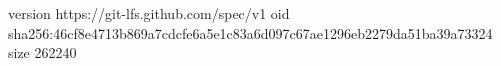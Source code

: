 version https://git-lfs.github.com/spec/v1
oid sha256:46cf8e4713b869a7cdcfe6a5e1c83a6d097c67ae1296eb2279da51ba39a73324
size 262240
